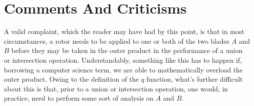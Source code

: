 \documentclass{birkjour}
\theoremstyle{definition}
\theoremstyle{remark}
\numberwithin{equation}{section}
\begin{document}
\section{Comments And Criticisms}

A valid complaint, which the reader may have had by this point,
is that in most circumstances, a rotor needs to be applied to one or
both of the two blades $A$ and $B$ before they may be taken in the
outer product in the performance of a union or intersection operation.
Understandably, something like this has to happen if, borrowing a computer
science term, we are able to mathematically overload the outer product.
Owing to the definition of the $q$ function, what's further difficult about this is
that, prior to a union or intersection
operation, one would, in practice, need to
perform some sort of analysis on $A$ and $B$.






\end{document}
